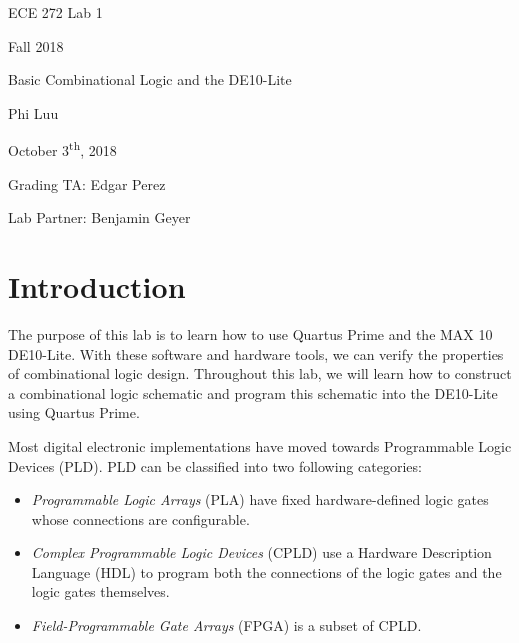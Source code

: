 \documentclass[12pt]{article}
\begin{document}
\begin{titlepage}
  \begin{center} \LARGE
    \vspace*{1.5in}

    ECE 272 Lab 1

    Fall 2018

    \vfill

    Basic Combinational Logic and the DE10-Lite

    Phi Luu

    \vfill

    October 3\textsuperscript{th}, 2018

    Grading TA: Edgar Perez

    Lab Partner: Benjamin Geyer

    \vspace{1.5in}
  \end{center}
\end{titlepage}

\section{Introduction}

The purpose of this lab is to learn how to use Quartus Prime and the MAX 10 DE10-Lite. With these software and hardware tools, we can verify the properties of combinational logic design. Throughout this lab, we will learn how to construct a combinational logic schematic and program this schematic into the DE10-Lite using Quartus Prime.

Most digital electronic implementations have moved towards Programmable Logic Devices (PLD). PLD can be classified into two following categories:

\begin{itemize}
  \item \textit{Programmable Logic Arrays} (PLA) have fixed hardware-defined logic gates whose connections are configurable.
  \item \textit{Complex Programmable Logic Devices} (CPLD) use a Hardware Description Language (HDL) to program both the connections of the logic gates and the logic gates themselves.
  \item \textit{Field-Programmable Gate Arrays} (FPGA) is a subset of CPLD.
\end{itemize}
\end{document}
